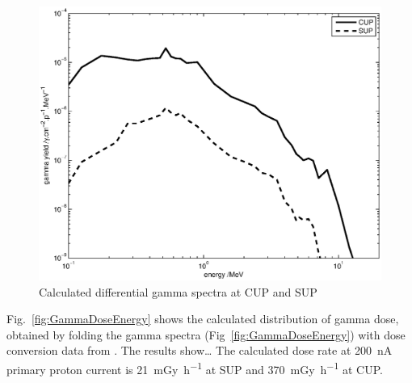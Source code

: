 \documentclass[11pt,a4paper]{IEEEtran}
\let\MYoriglatexcaption\caption
\renewcommand{\caption}[2][\relax]{\MYoriglatexcaption[#2]{#2}}
\begin{document}
\begin{figure}[t]
    \centering
    \includegraphics[width=0.9\columnwidth]{gDYieldcomparedRADECS.eps}
    \caption{Calculated differential gamma spectra at CUP and SUP}
    \label{fig:DifferentialGammaSpectra}
\end{figure}

Fig.~\ref{fig:GammaDoseEnergy} shows the calculated distribution of gamma dose, obtained by folding the gamma spectra (Fig~\ref{fig:GammaDoseEnergy}) with dose conversion data from \cite{tbd}.
The results show\ldots
{}
The calculated dose rate at \SI{200}{\nA} primary proton current is \SI{21}{\milli\gray\per\hour} at SUP and \SI{370}{\milli\gray\per\hour} at CUP.
\end{document}
